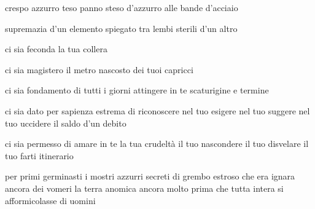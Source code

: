 \clearpage


\begin{poem}
	\begin{stanza}
		crespo azzurro teso\verseline
		panno steso d’azzurro\verseline
		alle bande d’acciaio
	\end{stanza}

	\begin{stanza}
		supremazia d’un elemento\verseline
		spiegato\verseline
		tra lembi sterili d’un altro
	\end{stanza}

	\begin{stanza}
		ci sia feconda\verseline
		la tua collera
	\end{stanza}

	\begin{stanza}
		ci sia magistero\verseline
		il metro nascosto\verseline
		dei tuoi capricci
	\end{stanza}

	\begin{stanza}
		ci sia fondamento\verseline
		di tutti i giorni\verseline
		attingere in te\verseline
		scaturigine e termine
	\end{stanza}

	\begin{stanza}
		ci sia dato
		per sapienza estrema\verseline
		di riconoscere\verseline
		nel tuo esigere\verseline
		nel tuo suggere\verseline
		nel tuo uccidere\verseline
		il saldo d’un debito
	\end{stanza}

	\begin{stanza}
		ci sia permesso\verseline
		di amare in te\verseline
		la tua crudeltà\verseline
		il tuo nascondere\verseline
		il tuo disvelare\verseline
		il tuo farti\verseline
		itinerario
	\end{stanza}
\end{poem}

\clearpage


\begin{poem}
	\begin{stanza}
		per primi germinasti\verseline
		i mostri azzurri\verseline
		secreti di grembo estroso\verseline
		che era ignara ancora\verseline
		dei vomeri la terra\verseline
		anomica ancora\verseline
		molto prima che tutta intera\verseline
		si afformicolasse di uomini
	\end{stanza}
\end{poem}

